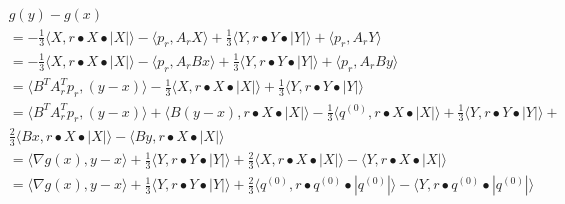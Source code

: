 \documentclass[12pt, letterpaper]{article}
\begin{document}
\begin{align*}
&g(y) - g(x) \\
&= -\frac{1}{3} \langle X,r \bullet X \bullet |X|\rangle  - \langle p_r,A_rX\rangle  + \frac{1}{3}\langle Y,r \bullet Y \bullet |Y|\rangle  + \langle p_r,A_rY\rangle   \\
&= -\frac{1}{3} \langle X,r \bullet X \bullet |X|\rangle  - \langle p_r,A_rBx\rangle  + \frac{1}{3}\langle Y,r \bullet Y \bullet |Y|\rangle  + \langle p_r,A_rBy\rangle   \\
&= \langle B^TA_r^Tp_r,(y - x)\rangle -\frac{1}{3} \langle X,r \bullet X \bullet |X|\rangle + \frac{1}{3}\langle Y,r \bullet Y \bullet |Y|\rangle \\
&= \langle B^TA_r^Tp_r,(y - x)\rangle + \langle B(y-x),r \bullet X \bullet |X|\rangle - \frac{1}{3}\langle q^{(0)},r \bullet X \bullet |X|\rangle + \frac{1}{3}\langle Y,r \bullet Y \bullet |Y|\rangle + \\
&\frac{2}{3} \langle Bx,r \bullet X \bullet |X|\rangle -  \langle By,r \bullet X \bullet |X|\rangle\\
&=  \langle \nabla g(x),y-x\rangle + \frac{1}{3}\langle Y,r \bullet Y \bullet |Y|\rangle + \frac{2}{3} \langle X,r \bullet X \bullet |X|\rangle -  \langle Y,r \bullet X \bullet |X|\rangle \\
&= \langle \nabla g(x),y-x\rangle + \frac{1}{3}\langle Y,r \bullet Y \bullet |Y|\rangle + \frac{2}{3} \langle q^{(0)},r \bullet q^{(0)} \bullet |q^{(0)}|\rangle -  \langle Y,r \bullet q^{(0)} \bullet |q^{(0)}|\rangle \\
\end{align*}
\end{document}
